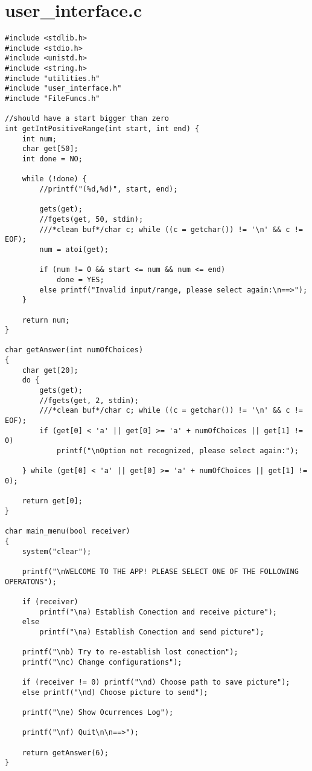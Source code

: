 \section{user\_interface.c}
\label{USERINTERFACEC}

\begin{lstlisting}
#include <stdlib.h>
#include <stdio.h>
#include <unistd.h>
#include <string.h>
#include "utilities.h"
#include "user_interface.h"
#include "FileFuncs.h"

//should have a start bigger than zero
int getIntPositiveRange(int start, int end) {
	int num;
	char get[50];
	int done = NO;

	while (!done) {
		//printf("(%d,%d)", start, end);

		gets(get);
		//fgets(get, 50, stdin); 
		///*clean buf*/char c; while ((c = getchar()) != '\n' && c != EOF);
		num = atoi(get);

		if (num != 0 && start <= num && num <= end)
			done = YES;
		else printf("Invalid input/range, please select again:\n==>");
	}

	return num;
}

char getAnswer(int numOfChoices)
{
	char get[20];
	do {
		gets(get);
		//fgets(get, 2, stdin); 
		///*clean buf*/char c; while ((c = getchar()) != '\n' && c != EOF);
		if (get[0] < 'a' || get[0] >= 'a' + numOfChoices || get[1] != 0)
			printf("\nOption not recognized, please select again:");

	} while (get[0] < 'a' || get[0] >= 'a' + numOfChoices || get[1] != 0);

	return get[0];
}

char main_menu(bool receiver)
{
	system("clear");

	printf("\nWELCOME TO THE APP! PLEASE SELECT ONE OF THE FOLLOWING OPERATONS");

	if (receiver)
		printf("\na) Establish Conection and receive picture");
	else
		printf("\na) Establish Conection and send picture");

	printf("\nb) Try to re-establish lost conection");
	printf("\nc) Change configurations");

	if (receiver != 0) printf("\nd) Choose path to save picture");
	else printf("\nd) Choose picture to send");

	printf("\ne) Show Ocurrences Log");

	printf("\nf) Quit\n\n==>");

	return getAnswer(6);
}



\end{lstlisting}
